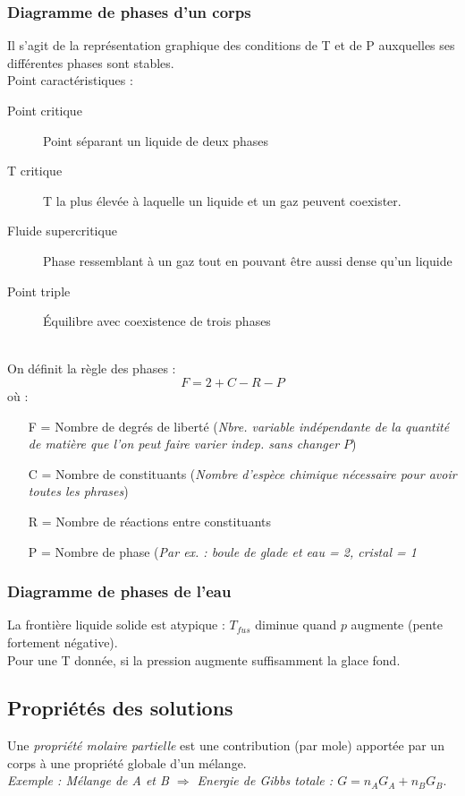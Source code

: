 \documentclass[12pt, a4paper]{article}
\begin{document}
\subsubsection{Diagramme de phases d'un corps}
Il s'agit de la représentation graphique des conditions de T et de P auxquelles ses différentes phases sont stables.\\
Point caractéristiques :
\begin{description}
\item[Point critique] Point séparant un liquide de deux phases
\item[T critique] T la plus élevée à laquelle un liquide et un gaz peuvent coexister.
\item[Fluide supercritique] Phase ressemblant à un gaz tout en pouvant être aussi dense qu'un liquide
\item[Point triple] Équilibre avec coexistence de trois phases
\end{description}
\ \\
On définit la règle des phases :
$$F = 2 + C - R - P$$
où :
\begin{itemize}
\item[F] = Nombre de degrés de liberté (\textit{Nbre. variable indépendante de la quantité de matière que l'on peut faire varier indep. sans changer $P$})
\item[C] = Nombre de constituants (\textit{Nombre d'espèce chimique nécessaire pour avoir toutes les phrases})
\item[R] = Nombre de réactions entre constituants
\item[P] = Nombre de phase (\textit{Par ex. : boule de glade et eau = 2, cristal = 1}
\end{itemize}
\subsubsection{Diagramme de phases de l'eau}
La frontière liquide solide est atypique : $T_{fus}$ diminue quand $p$ augmente (pente fortement négative).\\
Pour une T donnée, si la pression augmente suffisamment la glace fond.

\subsection{Propriétés des solutions}
Une \textit{propriété molaire partielle} est une contribution (par mole) apportée par un corps à une propriété  globale d'un mélange.\\
\textit{Exemple : Mélange de A et B $\Rightarrow$ Energie de Gibbs totale : $G = n_A G_A + n_B G_B$}.\\
\end{document}
